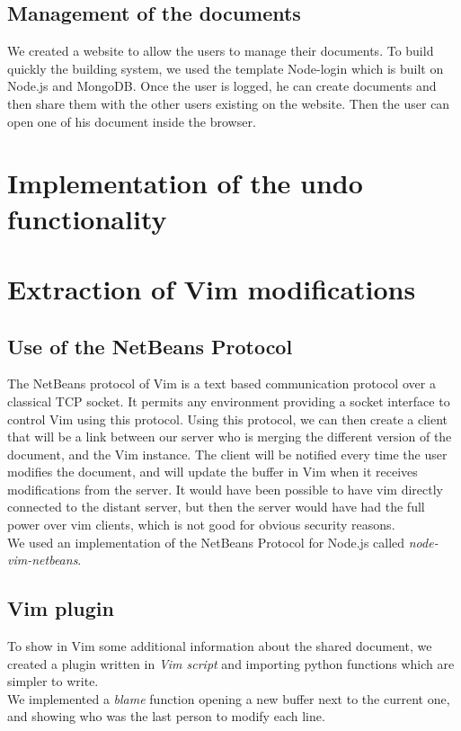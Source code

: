 \documentclass{llncs}
\begin{document}
\subsection{Management of the documents}

We created a website to allow the users to manage their documents.
To build quickly the building system, we used the template Node-login which is built
on Node.js and MongoDB.
Once the user is logged, he can create documents and then share them with the other
users existing on the website. Then the user can open one of his document inside the browser.

\section{Implementation of the undo functionality}\label{sec:Others}

\section{Extraction of Vim modifications}\label{sec:Others}

\subsection{Use of the NetBeans Protocol}

The NetBeans protocol of Vim is a text based communication protocol over a
classical TCP socket.
It permits any environment providing a socket interface to control Vim using
this protocol.\cite{netbeans} Using this protocol, we can then create a client
that will be a link between our server who is merging the different version of
the document, and the Vim instance.
The client will be notified every time the user modifies the document, and will
update the buffer in Vim when it receives modifications from the server.
It would have been possible to have vim directly connected to the distant
server, but then the server would have had the full power over vim clients,
which is not good for obvious security reasons.\\
We used an implementation of the NetBeans Protocol for Node.js called
\textit{node-vim-netbeans}.\cite{node-vim-netbeans}

\subsection{Vim plugin}

To show in Vim some additional information about the shared document, we
created a plugin written in \textit{Vim script} and importing python functions
which are simpler to write.\\
We implemented a \textit{blame} function opening a new buffer next to the
current one, and showing who was the last person to modify each line.
\end{document}
